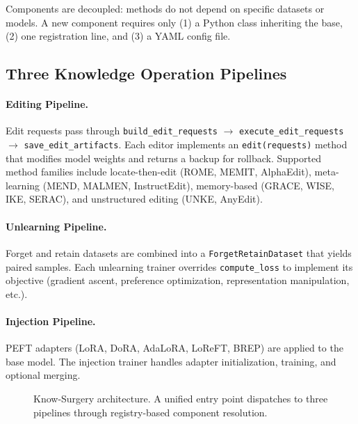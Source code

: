 Components are decoupled: methods do not depend on specific datasets or models.
A new component requires only (1) a Python class inheriting the base, (2) one registration line, and (3) a YAML config file.

\subsection{Three Knowledge Operation Pipelines}

\paragraph{Editing Pipeline.}
Edit requests pass through \texttt{build\_edit\_requests} $\to$ \texttt{execute\_edit\_requests} $\to$ \texttt{save\_edit\_artifacts}.
Each editor implements an \texttt{edit(requests)} method that modifies model weights and returns a backup for rollback.
Supported method families include locate-then-edit (ROME, MEMIT, AlphaEdit), meta-learning (MEND, MALMEN, InstructEdit), memory-based (GRACE, WISE, IKE, SERAC), and unstructured editing (UNKE, AnyEdit).

\paragraph{Unlearning Pipeline.}
Forget and retain datasets are combined into a \texttt{ForgetRetainDataset} that yields paired samples.
Each unlearning trainer overrides \texttt{compute\_loss} to implement its objective (gradient ascent, preference optimization, representation manipulation, etc.).

\paragraph{Injection Pipeline.}
PEFT adapters (LoRA, DoRA, AdaLoRA, LoReFT, BREP) are applied to the base model.
The injection trainer handles adapter initialization, training, and optional merging.

\begin{figure}[t]
\centering
{}
\caption{Know-Surgery architecture. A unified entry point dispatches to three pipelines through registry-based component resolution.}
\label{fig:architecture}
\end{figure}
